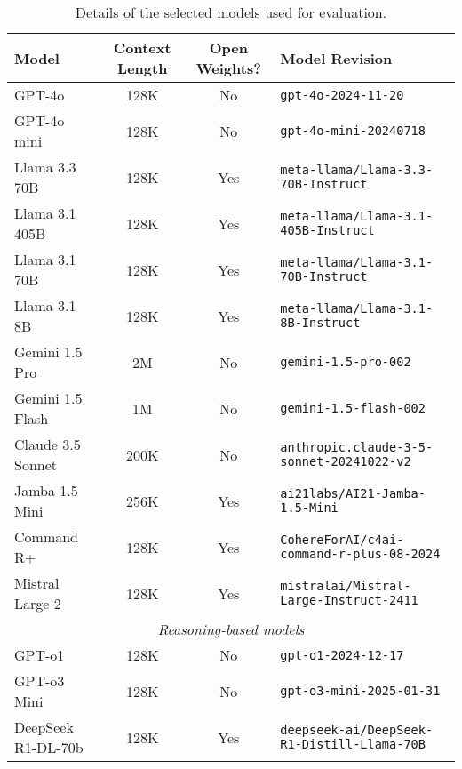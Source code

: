 \begin{table*}[h]
        \small
	\setlength\tabcolsep{5pt}
	\centering
	\begin{tabular}{lccl}
		\toprule
        \textbf{Model}  &   Context Length  & Open Weights? &   Model Revision \\
        \midrule
        GPT-4o              & 128K & No & \texttt{gpt-4o-2024-11-20} \\
        GPT-4o mini         & 128K & No & \texttt{gpt-4o-mini-20240718} \\
        \midrule
        Llama 3.3 70B       & 128K & Yes & \texttt{meta-llama/Llama-3.3-70B-Instruct} \\
        Llama 3.1 405B      & 128K & Yes & \texttt{meta-llama/Llama-3.1-405B-Instruct} \\
        Llama 3.1 70B       & 128K & Yes & \texttt{meta-llama/Llama-3.1-70B-Instruct} \\
        Llama 3.1 8B        & 128K & Yes & \texttt{meta-llama/Llama-3.1-8B-Instruct} \\
        \midrule
        Gemini 1.5 Pro      & 2M   & No     & \texttt{gemini-1.5-pro-002} \\
        Gemini 1.5 Flash    & 1M   & No     & \texttt{gemini-1.5-flash-002} \\ 
        \midrule
        Claude 3.5 Sonnet   & 200K & No     & \texttt{anthropic.claude-3-5-sonnet-20241022-v2} \\ 
        \midrule
        Jamba 1.5 Mini      & 256K & Yes    & \texttt{ai21labs/AI21-Jamba-1.5-Mini} \\ 
        Command R+          & 128K & Yes    & \texttt{CohereForAI/c4ai-command-r-plus-08-2024} \\ 
        Mistral Large 2     & 128K & Yes    & \texttt{mistralai/Mistral-Large-Instruct-2411} \\
        \midrule
        \multicolumn{4}{c}{\emph{Reasoning-based models}} \\
        GPT-o1              & 128K & No    & \texttt{gpt-o1-2024-12-17} \\ 
        GPT-o3 Mini         & 128K & No    & \texttt{gpt-o3-mini-2025-01-31} \\ 
        DeepSeek R1-DL-70b  & 128K & Yes    & \texttt{deepseek-ai/DeepSeek-R1-Distill-Llama-70B} \\
	\bottomrule
	\end{tabular}
	\caption{Details of the selected models used for evaluation.}
	\label{tab:model_details}
\end{table*}
